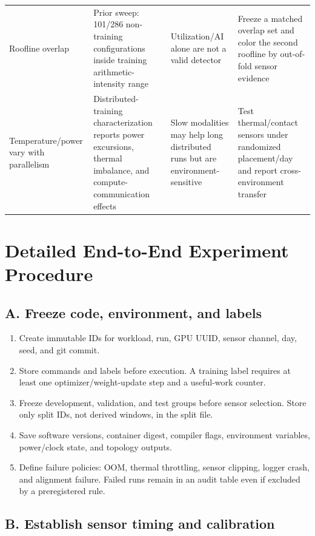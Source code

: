 \documentclass[sigplan,anonymous,review,nonacm]{acmart}
\begin{document}
\begin{table}[H]
\begin{tabularx}{\textwidth}{p{3.0cm}p{3.2cm}Xp{3.7cm}}
Roofline overlap & Prior sweep: 101/286 non-training configurations inside training arithmetic-intensity range & Utilization/AI alone are not a valid detector & Freeze a matched overlap set and color the second roofline by out-of-fold sensor evidence \\
Temperature/power vary with parallelism & Distributed-training characterization reports power excursions, thermal imbalance, and compute-communication effects~\cite{go2025distributed} & Slow modalities may help long distributed runs but are environment-sensitive & Test thermal/contact sensors under randomized placement/day and report cross-environment transfer \\
\bottomrule
\end{tabularx}
\end{table}

\section{Detailed End-to-End Experiment Procedure}
\label{app:steps}

\subsection{A. Freeze code, environment, and labels}

\begin{enumerate}
\item Create immutable IDs for workload, run, GPU UUID, sensor channel, day, seed, and git commit.
\item Store commands and labels before execution. A training label requires at least one optimizer/weight-update step and a useful-work counter.
\item Freeze development, validation, and test groups before sensor selection. Store only split IDs, not derived windows, in the split file.
\item Save software versions, container digest, compiler flags, environment variables, power/clock state, and topology outputs.
\item Define failure policies: OOM, thermal throttling, sensor clipping, logger crash, and alignment failure. Failed runs remain in an audit table even if excluded by a preregistered rule.
\end{enumerate}

\subsection{B. Establish sensor timing and calibration}
\end{document}
